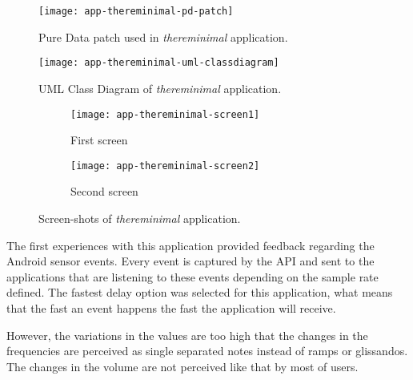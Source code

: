 \begin{figure}[!ht]
\centering
\texttt{[image: app-thereminimal-pd-patch]}
\caption{Pure Data patch used in \textit{thereminimal} application.}
\label{fig:thereminimal-pd-patch}
\end{figure}

\begin{figure}[!ht]
\centering
\texttt{[image: app-thereminimal-uml-classdiagram]}
\caption{UML Class Diagram of \textit{thereminimal} application.}
\label{fig:thereminimal-uml-classdiagram}
\end{figure}

\begin{figure*}[!ht]
\centering
\begin{subfigure}{.30\textwidth}
	\texttt{[image: app-thereminimal-screen1]}
    \caption{First screen}
	\label{fig:appthereminimalfirstscreen}
\end{subfigure}
\begin{subfigure}{.30\textwidth}
	\texttt{[image: app-thereminimal-screen2]}
	\caption{Second screen}
	\label{fig:appthereminimalsecondscreen}
\end{subfigure}

\caption{Screen-shots of \textit{thereminimal} application.}
\label{fig:appthereminimal}
\end{figure*}

The first experiences with this application provided feedback regarding the Android sensor events.
Every event is captured by the API and sent to the applications that are listening to these events depending on the sample rate defined.
The fastest delay option was selected for this application, what means that the fast an event happens the fast the application will receive.

However, the variations in the values are too high that the changes in the frequencies are perceived as single separated notes instead of ramps or glissandos.
The changes in the volume are not perceived like that by most of users. %

